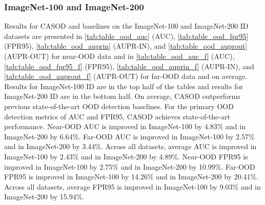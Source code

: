 \subsubsection{ImageNet-100 and ImageNet-200}
Results for CASOD and baselines on the ImageNet-100 and ImageNet-200 ID datasets are presented in \ref{tab:table_ood_auc} (AUC), \ref{tab:table_ood_fpr95} (FPR95), \ref{tab:table_ood_auprin} (AUPR-IN), and \ref{tab:table_ood_auprout} (AUPR-OUT) for near-OOD data and in \ref{tab:table_ood_auc_f} (AUC), \ref{tab:table_ood_fpr95_f} (FPR95), \ref{tab:table_ood_auprin_f} (AUPR-IN), and \ref{tab:table_ood_auprout_f} (AUPR-OUT) for far-OOD data and on average. %
Results for ImageNet-100 ID are in the top half of the tables and results for ImageNet-200 ID are in the bottom half. On average, CASOD outperforms previous state-of-the-art OOD detection baselines. For the primary OOD detection metrics of AUC and FPR95, CASOD achieves state-of-the-art performance. Near-OOD AUC is improved in ImageNet-100 by 4.83\% and in ImageNet-200 by 6.64\%. Far-OOD AUC is improved in ImageNet-100 by 2.57\% and in ImageNet-200 by 3.44\%. Across all datasets, average AUC is improved in ImageNet-100 by 2.43\% and in ImageNet-200 by 4.89\%. Near-OOD FPR95 is improved in ImageNet-100 by 2.75\% and in ImageNet-200 by 10.99\%. Far-OOD FPR95 is improved in ImageNet-100 by 14.26\% and in ImageNet-200 by 20.41\%. Across all datasets, average FPR95 is improved in ImageNet-100 by 9.03\% and in ImageNet-200 by 15.94\%.

